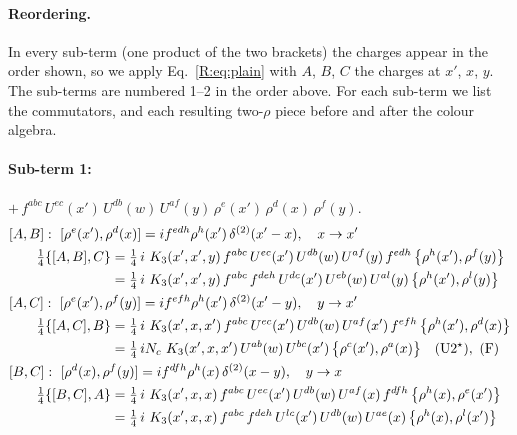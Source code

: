 \documentclass[10pt]{article}
\numberwithin{equation}{section}
\begin{document}
\paragraph{Reordering.} In every sub-term (one product of the two brackets) the charges appear in the order shown, so we apply Eq.~\eqref{R:eq:plain} with $A$, $B$, $C$ the charges at $x'$, $x$, $y$. The sub-terms are numbered 1--2 in the order above. For each sub-term we list the commutators, and each resulting two-$\rho$ piece before and after the colour algebra.
\paragraph{Sub-term 1:} $+\,f^{abc}\,U^{ec}(x')\,U^{db}(w)\,U^{af}(y)\,\rho^{e}(x')\,\rho^{d}(x)\,\rho^{f}(y)$.
\begin{align}
&[A,B]:\ [\rho^{e}(x'),\rho^{d}(x)]=i f^{edh}\rho^{h}(x')\,\delta^{(2)}(x'-x),\quad x\to x'\notag\\
&\qquad \tfrac14\{[A,B],C\}=\tfrac14\,i\,\,K_3(x',x',y)\,f^{abc}\,U^{ec}(x')\,U^{db}(w)\,U^{af}(y)\,f^{edh}\,\big\{\rho^{h}(x'),\rho^{f}(y)\big\}\notag\\
&\qquad\phantom{\tfrac14\{[A,B],C\}}=\tfrac14\,i\,\,K_3(x',x',y)\,f^{abc}\,f^{deh}\,U^{dc}(x')\,U^{eb}(w)\,U^{al}(y)\,\big\{\rho^{h}(x'),\rho^{l}(y)\big\}
\label{R:eq:B2-1-AB}\\
&[A,C]:\ [\rho^{e}(x'),\rho^{f}(y)]=i f^{efh}\rho^{h}(x')\,\delta^{(2)}(x'-y),\quad y\to x'\notag\\
&\qquad \tfrac14\{[A,C],B\}=\tfrac14\,i\,\,K_3(x',x,x')\,f^{abc}\,U^{ec}(x')\,U^{db}(w)\,U^{af}(x')\,f^{efh}\,\big\{\rho^{h}(x'),\rho^{d}(x)\big\}\notag\\
&\qquad\phantom{\tfrac14\{[A,C],B\}}=\tfrac14\,i N_{c}\,\,K_3(x',x,x')\,U^{ab}(w)\,U^{bc}(x')\,\big\{\rho^{c}(x'),\rho^{a}(x)\big\}\quad\text{(U2$^\star$)},\ \text{(F)}
\label{R:eq:B2-1-AC}\\
&[B,C]:\ [\rho^{d}(x),\rho^{f}(y)]=i f^{dfh}\rho^{h}(x)\,\delta^{(2)}(x-y),\quad y\to x\notag\\
&\qquad \tfrac14\{[B,C],A\}=\tfrac14\,i\,\,K_3(x',x,x)\,f^{abc}\,U^{ec}(x')\,U^{db}(w)\,U^{af}(x)\,f^{dfh}\,\big\{\rho^{h}(x),\rho^{e}(x')\big\}\notag\\
&\qquad\phantom{\tfrac14\{[B,C],A\}}=\tfrac14\,i\,\,K_3(x',x,x)\,f^{abc}\,f^{deh}\,U^{lc}(x')\,U^{db}(w)\,U^{ae}(x)\,\big\{\rho^{h}(x),\rho^{l}(x')\big\}
\label{R:eq:B2-1-BC}
\end{align}
\end{document}
